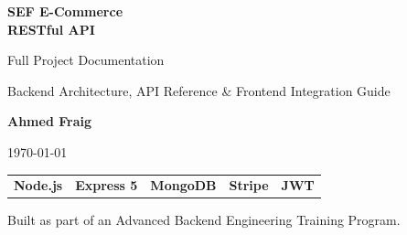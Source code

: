 \documentclass[12pt,a4paper]{report}
\begin{document}
\begin{titlepage}
  \centering
  \vspace*{2cm}
  {\Huge\bfseries\color{darkblue} SEF E-Commerce\\RESTful API\par}
  \vspace{1cm}
  {\Large Full Project Documentation\par}
  \vspace{0.5cm}
  {\large\color{codegray} Backend Architecture, API Reference \& Frontend Integration Guide\par}
  \vspace{2cm}
  {\large\bfseries Ahmed Fraig\par}
  \vspace{0.5cm}
  {\large \today\par}
  \vspace{2cm}
  \begin{tabular}{ccccc}
    \textbf{Node.js} & \textbf{Express 5} & \textbf{MongoDB} & \textbf{Stripe} & \textbf{JWT} \\
  \end{tabular}
  \vfill
  {\small Built as part of an Advanced Backend Engineering Training Program.}
\end{titlepage}

\tableofcontents
\newpage












\end{document}

